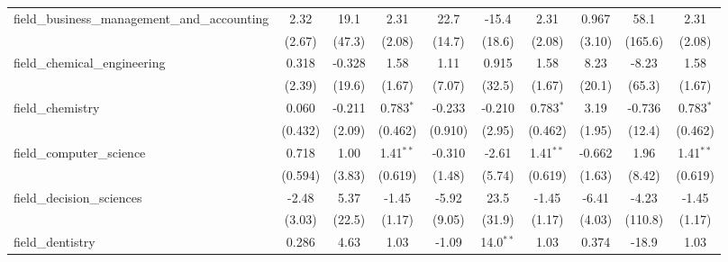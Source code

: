 \begin{tabular}{lccccccccc}
   field\_business\_management\_and\_accounting                & 2.32           & 19.1           & 2.31           & 22.7           & -15.4         & 2.31           & 0.967          & 58.1           & 2.31\\   
                                                               & (2.67)         & (47.3)         & (2.08)         & (14.7)         & (18.6)        & (2.08)         & (3.10)         & (165.6)        & (2.08)\\   
   field\_chemical\_engineering                                & 0.318          & -0.328         & 1.58           & 1.11           & 0.915         & 1.58           & 8.23           & -8.23          & 1.58\\   
                                                               & (2.39)         & (19.6)         & (1.67)         & (7.07)         & (32.5)        & (1.67)         & (20.1)         & (65.3)         & (1.67)\\   
   field\_chemistry                                            & 0.060          & -0.211         & 0.783$^{*}$    & -0.233         & -0.210        & 0.783$^{*}$    & 3.19           & -0.736         & 0.783$^{*}$\\   
                                                               & (0.432)        & (2.09)         & (0.462)        & (0.910)        & (2.95)        & (0.462)        & (1.95)         & (12.4)         & (0.462)\\   
   field\_computer\_science                                    & 0.718          & 1.00           & 1.41$^{**}$    & -0.310         & -2.61         & 1.41$^{**}$    & -0.662         & 1.96           & 1.41$^{**}$\\   
                                                               & (0.594)        & (3.83)         & (0.619)        & (1.48)         & (5.74)        & (0.619)        & (1.63)         & (8.42)         & (0.619)\\   
   field\_decision\_sciences                                   & -2.48          & 5.37           & -1.45          & -5.92          & 23.5          & -1.45          & -6.41          & -4.23          & -1.45\\   
                                                               & (3.03)         & (22.5)         & (1.17)         & (9.05)         & (31.9)        & (1.17)         & (4.03)         & (110.8)        & (1.17)\\   
   field\_dentistry                                            & 0.286          & 4.63           & 1.03           & -1.09          & 14.0$^{**}$   & 1.03           & 0.374          & -18.9          & 1.03\\   

\end{tabular}
